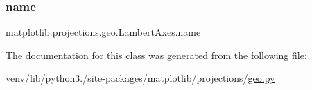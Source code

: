\subsubsection{\texorpdfstring{name}{name}}
{\footnotesize\ttfamily matplotlib.\+projections.\+geo.\+Lambert\+Axes.\+name\hspace{0.3cm}{\ttfamily [static]}}



The documentation for this class was generated from the following file\+:\begin{DoxyCompactItemize}
\item 
venv/lib/python3./site-\/packages/matplotlib/projections/\hyperlink{geo_8py}{geo.\+py}\end{DoxyCompactItemize}
